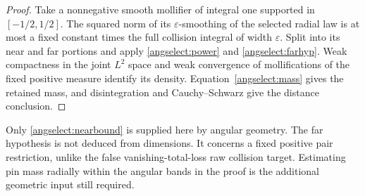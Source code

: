 \begin{proof}
Take a nonnegative smooth mollifier of integral one supported in
\([-1/2,1/2]\). The squared norm of its \(\varepsilon\)-smoothing
of the selected radial law is at most a fixed constant times the full
collision integral of width \(\varepsilon\). Split into its near
and far portions and apply \eqref{angselect:power} and
\eqref{angselect:farhyp}. Weak compactness in the joint \(L^2\)
space and weak convergence of mollifications of the fixed positive
measure identify its density. Equation~\eqref{angselect:mass}
gives the retained mass, and disintegration and Cauchy--Schwarz give
the distance conclusion.
\end{proof}

Only \eqref{angselect:nearbound} is supplied here by angular geometry.
The far hypothesis is not deduced from dimensions. It concerns a fixed
positive pair restriction, unlike the false vanishing-total-loss raw
collision target. Estimating pin mass radially within the angular bands
in the proof is the additional geometric input still required.
